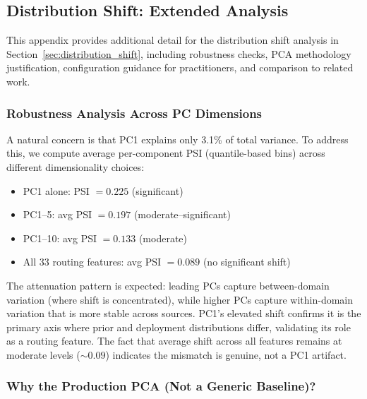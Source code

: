 
\subsection{Distribution Shift: Extended Analysis}
\label{app:distribution_shift_details}

This appendix provides additional detail for the distribution shift analysis in Section~\ref{sec:distribution_shift}, including robustness checks, PCA methodology justification, configuration guidance for practitioners, and comparison to related work.

\subsubsection{Robustness Analysis Across PC Dimensions}

A natural concern is that PC1 explains only 3.1\% of total variance. To address this, we compute average per-component PSI (quantile-based bins) across different dimensionality choices:

\begin{itemize}[leftmargin=*,noitemsep,topsep=2pt]
    \item PC1 alone: PSI $= 0.225$ (significant)
    \item PC1--5: avg PSI $= 0.197$ (moderate--significant)
    \item PC1--10: avg PSI $= 0.133$ (moderate)
    \item All 33 routing features: avg PSI $= 0.089$ (no significant shift)
\end{itemize}

\noindent The attenuation pattern is expected: leading PCs capture between-domain variation (where shift is concentrated), while higher PCs capture within-domain variation that is more stable across sources. PC1's elevated shift confirms it is the primary axis where prior and deployment distributions differ, validating its role as a routing feature. The fact that average shift across all features remains at moderate levels ($\sim 0.09$) indicates the mismatch is genuine, not a PC1 artifact.

\subsubsection{Why the Production PCA (Not a Generic Baseline)?}

